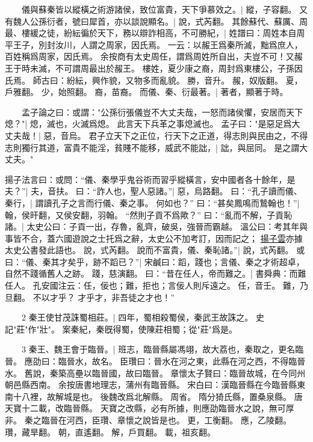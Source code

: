 　　儀與蘇秦皆以縱橫之術游諸侯，致位富貴，天下爭慕效之。|{
	縱，子容翻。
}
又有魏人公孫衍者，號曰犀首，亦以談說顯名。|{
	說，式芮翻。
}
其餘蘇代、蘇厲、周最、樓緩之徒，紛紜徧於天下，務以辯詐相高，不可勝紀，|{
	姓譜曰：周姓本自周平王子，別封汝川，人謂之周家，因氏焉。
	一云：以赧王爲秦所滅，黜爲庶人，百姓稱爲周家，因氏焉。
	余按商有太史周任，謂爲周姓所自出，夫豈不可！又赧王于時未滅，不可謂周最出於赧王。
	樓姓，夏少康之裔，周封爲東樓公，子孫因氏焉。
	師古曰：紛紜，興作貌，又物多而亂貌。
	勝，音升。
	赧，奴版翻。
	夏，戶雅翻。
	少，始照翻。
	裔，苗裔。
}
而儀、秦、衍最著。|{
	著者，顯著于時。
}

　　孟子論之曰：或謂："公孫衍張儀豈不大丈夫哉，一怒而諸侯懼，安居而天下熄？"|{
	熄，滅也，火滅爲熄。
	此言天下兵革之事熄滅也。
}
孟子曰："是惡足爲大丈夫哉！|{
	惡，音烏。
}
君子立天下之正位，行天下之正道，得志則與民由之，不得志則獨行其道，富貴不能淫，貧賤不能移，威武不能詘，|{
	詘，與屈同。
}
是之謂大丈夫。"


揚子法言曰：或問：“儀、秦學乎鬼谷術而習乎縱橫言，安中國者各十餘年，是夫？”|{
	夫，音扶。
}
曰：“詐人也，聖人惡諸。”|{
	惡，烏路翻。
}
曰：“孔子讀而儀、秦行，|{
	謂讀孔子之言而行儀、秦之事。
}
何如也？”
曰：“甚矣鳳鳴而鷙翰也！”|{
	翰，侯旰翻，又侯安翻，羽翰。
}
“然則子貢不爲歟？”
曰：“亂而不解，子貢恥諸。|{
	太史公曰：子貢一出，存魯，亂齊，破吳，強晉而霸越。
	溫公曰：考其年與事皆不合，蓋六國遊說之士托爲之辭，太史公不加考訂，因而記之；
	\underline{揚子雲}亦據太史公書發此語也。
	說，式芮翻。
}
說而不富貴，儀、秦恥諸。”|{
	說，式芮翻。
}
或曰：“儀、秦其才矣乎，跡不蹈已？”|{
	宋鹹曰：蹈，踐也；言儀、秦之才術超卓，自然不踐循舊人之跡。
	踐，慈演翻。
}
曰：“昔在任人，帝而難之。|{
	書舜典：而難任人。
	孔安國注云：任，佞也；難，拒也；言佞人則斥遠之。
	任，音壬。
	難，乃旦翻。
}
不以才乎？
才乎才，非吾徒之才也！”

　　2 秦王使甘茂誅蜀相莊。|{
	四年，蜀相殺蜀侯，秦武王故誅之。
	史記"莊"作"壯"。
	案秦紀，秦旣得蜀，使陳莊相蜀；從"莊"爲是。
}

　　3 秦王、魏王會于臨晉。|{
	班志，臨晉縣屬馮翊，故大荔也，秦取之，更名臨晉。
	應劭曰：臨晉水，故名。
	臣瓚曰：晉水在河之東，此縣在河之西，不得臨晉水。
	舊說，秦築高壘以臨晉國，故曰臨晉。
	章懷太子賢曰：臨晉故城，在今同州朝邑縣西南。
	余按唐書地理志，蒲州有臨晉縣。
	宋白曰：漢臨晉縣在今臨晉縣東南十八裡，故解城是也。
	後魏改爲北解縣。
	周省。
	隋分猗氏縣，置桑泉縣。
	唐天寶十二載，改臨晉縣。
	天寶之改縣，必有所據，則應劭臨晉水之說，無可厚非。
	秦之臨晉在河西，臣瓚、章懷之說皆是也。
	更，工衡翻。
	應，乙陵翻。
	瓚，藏旱翻。
	朝，直遙翻。
	解，戶買翻。
	載，祖亥翻。
}

